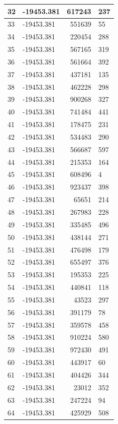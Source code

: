 \documentclass[]{book}
\theoremstyle{definition}
\theoremstyle{definition}
\theoremstyle{definition}
\theoremstyle{remark}
\begin{document}
\begin{tabular}{l|l|r|l}
\hline
32 & -19453.381 & 617243 & 237\\
\hline
33 & -19453.381 & 551639 & 55\\
\hline
34 & -19453.381 & 220454 & 288\\
\hline
35 & -19453.381 & 567165 & 319\\
\hline
36 & -19453.381 & 561664 & 392\\
\hline
37 & -19453.381 & 437181 & 135\\
\hline
38 & -19453.381 & 462228 & 298\\
\hline
39 & -19453.381 & 900268 & 327\\
\hline
40 & -19453.381 & 741484 & 441\\
\hline
41 & -19453.381 & 178475 & 231\\
\hline
42 & -19453.381 & 534483 & 290\\
\hline
43 & -19453.381 & 566687 & 597\\
\hline
44 & -19453.381 & 215353 & 164\\
\hline
45 & -19453.381 & 608496 & 4\\
\hline
46 & -19453.381 & 923437 & 398\\
\hline
47 & -19453.381 & 65651 & 214\\
\hline
48 & -19453.381 & 267983 & 228\\
\hline
49 & -19453.381 & 335485 & 496\\
\hline
50 & -19453.381 & 438144 & 271\\
\hline
51 & -19453.381 & 476498 & 179\\
\hline
52 & -19453.381 & 655497 & 376\\
\hline
53 & -19453.381 & 195353 & 225\\
\hline
54 & -19453.381 & 440841 & 118\\
\hline
55 & -19453.381 & 43523 & 297\\
\hline
56 & -19453.381 & 391179 & 78\\
\hline
57 & -19453.381 & 359578 & 458\\
\hline
58 & -19453.381 & 910224 & 580\\
\hline
59 & -19453.381 & 972430 & 491\\
\hline
60 & -19453.381 & 443917 & 60\\
\hline
61 & -19453.381 & 404426 & 344\\
\hline
62 & -19453.381 & 23012 & 352\\
\hline
63 & -19453.381 & 247224 & 94\\
\hline
64 & -19453.381 & 425929 & 508\\

\end{tabular}
\end{document}
